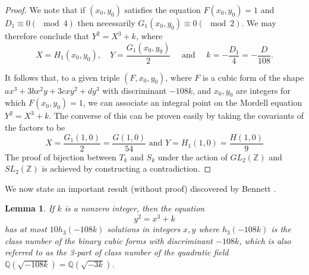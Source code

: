 \documentclass[12pt]{amsart}
\theoremstyle{plain}
\newtheorem{lemma}[thm]{Lemma}
\theoremstyle{definition}
\theoremstyle{remark}
\numberwithin{equation}{section}
\numberwithin{thm}{section}
\theoremstyle{named}
\theoremstyle{named}
\begin{document}
\begin{proof}
We note that if $\left(x_0, y_0\right)$ satisfies the equation $F\left(x_0, y_0\right)=1$ and $D_1 \equiv 0 (\mod 4)$ then necessarily $G_1\left(x_0, y_0\right) \equiv 0 (\mod 2)$. We may therefore conclude that $Y^2=X^3+k$, where
\begin{equation*}
X=H_1\left(x_0, y_0\right), \quad Y=\frac{G_1\left(x_0, y_0\right)}{2} \quad \text { and } \quad k=-\frac{D_1}{4}=-\frac{D}{108} .
\end{equation*}

It follows that, to a given triple $\left(F, x_0, y_0\right)$, where $F$ is a cubic form of the shape $ax^3 + 3bx^2y + 3cxy^2 + dy^3$ with discriminant $-108 k$, and $x_0, y_0$ are integers for which $F\left(x_0, y_0\right)=1$, we can associate an integral point on the Mordell equation $Y^2=X^3+k$.
The converse of this can be proven easily by taking the covariants of the factors to be \begin{equation*}
X=\frac{G_1(1,0)}{2}=\frac{G(1,0)}{54} \text { and } Y=H_1(1,0)=\frac{H(1,0)}{9} \end{equation*}
The proof of bijection between $T_k$ and $S_k$ under the action of $GL_2(\mathbb Z)$ and $SL_2(\mathbb Z)$ is achieved by constructing a contradiction.
\end{proof}
We now state an important result (without proof) discovered by {Bennett}  \cite{b1b163cc-e48b-3585-a6ac-6a99c5137c3e}.
\begin{lemma}
    If $k$ is a nonzero integer, then the equation $$ y^2 = x^3 + k$$ has at most $10 h_3(-108k)$ solutions in integers $x,y$ where $h_3(-108k)$ is the class number of the binary cubic forms with discriminant $-108k$, which is also referred to as the 3-part of class number of the quadratic field $\mathbb{Q}(\sqrt{-108k}) = \mathbb{Q}(\sqrt{-3k})$. 
\end{lemma}
\end{document}
